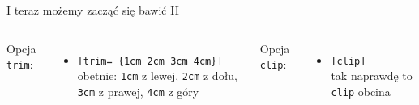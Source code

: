 \documentclass[handout]{beamer}
\begin{document}
\begin{frame}{I teraz możemy zacząć się bawić II}{}
\begin{columns}
    Opcja \texttt{trim}:
    \begin{itemize}%
        \item \texttt{[trim= \{1cm 2cm 3cm 4cm\}]}\\
        obetnie:
        \texttt{1cm} z lewej,
        \texttt{2cm} z dołu,
        \texttt{3cm} z prawej,
        \texttt{4cm} z góry
    \end{itemize}\pause
    Opcja \texttt{clip}:
    \begin{itemize}%
        \item \texttt{[clip]}\\
        tak naprawdę to \texttt{clip} obcina
    \end{itemize} 



\end{columns}
\end{frame}
\end{document}

